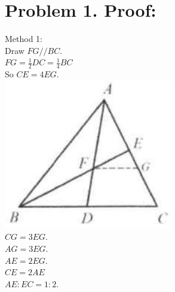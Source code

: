 \documentclass[10pt]{article}
\begin{document}
\section*{Problem 1. Proof:}
Method 1:\\
Draw \(F G / / B C\).\\
\(F G=\frac{1}{2} D C=\frac{1}{4} B C\)\\
So \(C E=4 E G\).\\
\includegraphics[max width=\textwidth, center]{2025_04_17_97bc1f7e44d93c271a88g-131(3)}\\
\(C G=3 E G\).\\
\(A G=3 E G\).\\
\(A E=2 E G\).\\
\(C E=2 A E\)\\
\(A E: E C=1: 2\).
\end{document}
